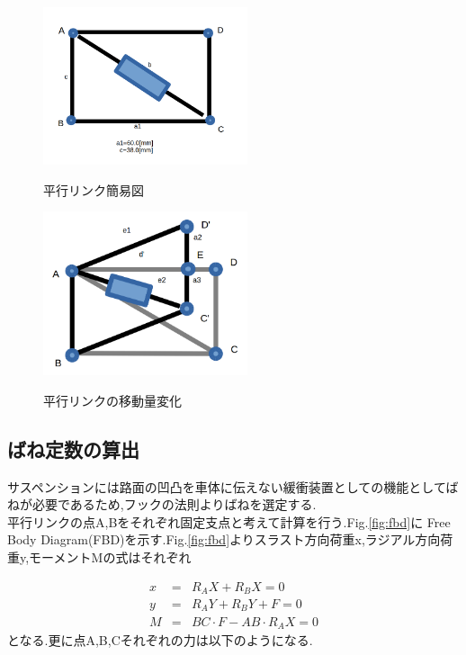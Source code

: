 \documentclass[a4paper]{jarticle}
\begin{document}
\begin{figure}[htp]
 \begin{center}
  \includegraphics[width=60mm]{img/fig5.png}
 　\caption{平行リンク簡易図}
  \label{fig:bix}%
 \end{center}
\end{figure}


\begin{figure}[htp]
 \begin{center}
  \includegraphics[width=60mm]{img/fig6.png}
 　\caption{平行リンクの移動量変化}
  \label{fig:rink}%
 \end{center}
\end{figure}

\subsection{ばね定数の算出}
サスペンションには路面の凹凸を車体に伝えない緩衝装置としての機能としてばねが必要であるため,フックの法則よりばねを選定する.　\\
平行リンクの点A,Bをそれぞれ固定支点と考えて計算を行う.Fig.\ref{fig:fbd}に Free Body Diagram(FBD)を示す.Fig.\ref{fig:fbd}よりスラスト方向荷重x,ラジアル方向荷重y,モーメントMの式はそれぞれ

\begin{eqnarray}
	x & = & R_AX+R_BX=0 \\
	y & = & R_AY+R_BY+F=0 \\
	M & = & BC\cdot F-AB\cdot R_AX=0
\end{eqnarray}
となる.更に点A,B,Cそれぞれの力は以下のようになる.
\end{document}
